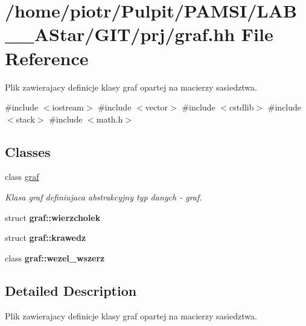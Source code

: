\hypertarget{graf_8hh}{\section{/home/piotr/\-Pulpit/\-P\-A\-M\-S\-I/\-L\-A\-B\-\_\-\_\-\-A\-Star/\-G\-I\-T/prj/graf.hh \-File \-Reference}
\label{graf_8hh}
}


\-Plik zawierajacy definicje klasy graf opartej na macierzy sasiedztwa.  


{\ttfamily \#include $<$iostream$>$}\*
{\ttfamily \#include $<$vector$>$}\*
{\ttfamily \#include $<$cstdlib$>$}\*
{\ttfamily \#include $<$stack$>$}\*
{\ttfamily \#include $<$math.\-h$>$}\*
\subsection*{\-Classes}
\begin{DoxyCompactItemize}
\item 
class \hyperlink{classgraf}{graf}
\begin{DoxyCompactList}\small\item\em \-Klasa graf definiujaca abstrakcyjny typ danych -\/ graf. \end{DoxyCompactList}\item 
struct {\bfseries graf\-::wierzcholek}
\item 
struct {\bfseries graf\-::krawedz}
\item 
class {\bfseries graf\-::wezel\-\_\-wszerz}
\end{DoxyCompactItemize}


\subsection{\-Detailed \-Description}
\-Plik zawierajacy definicje klasy graf opartej na macierzy sasiedztwa. 